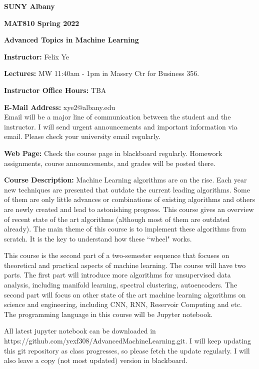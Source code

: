 \documentclass[a4paper,10pt]{article}
\begin{document}
\begin{center}

\textbf{SUNY Albany}

\textbf{MAT810 Spring 2022}

\textbf{Advanced Topics in Machine Learning}


\end{center}

\textbf{Instructor:} Felix Ye 

\textbf{Lectures:} MW 11:40am - 1pm  in Massry Ctr for Business 356.

\textbf{Instructor Office Hours:} TBA


\textbf{E-Mail Address:} xye2@albany.edu\\
Email will be a major line of communication between the student and the instructor. I will send urgent announcements and important information via email. Please check your university email regularly.

\textbf{Web Page:}
Check the course page in blackboard regularly. Homework assignments, course announcements, and grades will be posted there.


\textbf{Course Description:}   Machine Learning algorithms are on the rise. Each year new techniques are presented that outdate the current leading algorithms. Some of them are only little advances or combinations of existing algorithms and others are newly created and lead to astonishing progress. This course gives an overview of recent state of the art algorithms (although most of them are outdated already). The main theme of this course is to implement these algorithms from scratch. It is the key to understand how these ``wheel" works. 

This course is the second part of a two-semester sequence that focuses on theoretical and practical aspects of machine learning. The course will have two parts. The first part will introduce more algorithms for unsupervised data analysis, including manifold learning, spectral clustering, autoencoders. The second part will focus on other state of the art machine learning algorithms on science and engineering, including CNN, RNN, Reservoir Computing and etc. The programming language in this course will be Jupyter notebook. 

All latest jupyter notebook can be downloaded in https://github.com/yexf308/AdvancedMachineLearning.git. I will keep updating this git repository as class progresses, so please fetch the update regularly. I will also leave a copy (not most updated) version in blackboard. 
\end{document}
